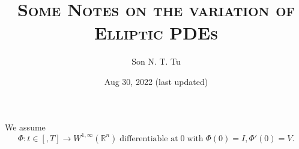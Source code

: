 \documentclass[12pt,oneside,reqno]{amsart}
\title{\textsc{Some Notes on the variation of Elliptic PDEs}}
\author{Son N. T. Tu}
\date{Aug 30, 2022 (last updated)}
\newcommand{\R}{\mathbb{R}}
\theoremstyle{plain}
\theoremstyle{remark}
\begin{document}
\maketitle


We assume 
\begin{equation*}
    \Phi: t\in [,T]\to W^{1,\infty}(\R^n) \;\text{differentiable at}\;0\;\text{with}\; \Phi(0) = I, \Phi'(0) = V.
\end{equation*}

{}

\end{document}
